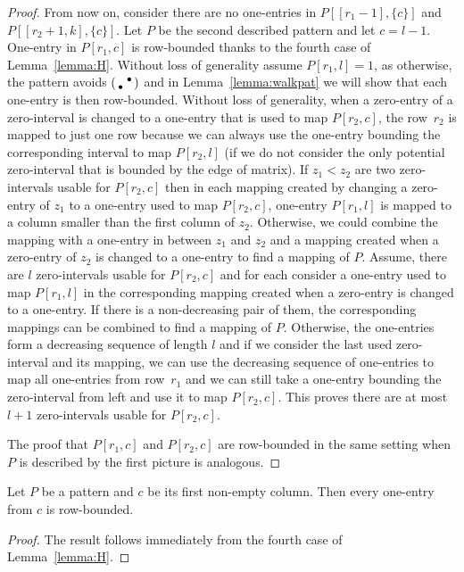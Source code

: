 \begin{proof}
From now on, consider there are no one-entries in $P[[r_1-1],\{c\}]$ and $P[[r_2+1,k],\{c\}]$. Let $P$ be the second described pattern and let $c=l-1$. One-entry in $P[r_1,c]$ is row-bounded thanks to the fourth case of Lemma~\ref{lemma:H}. Without loss of generality assume $P[r_1,l]=1$, as otherwise, the pattern avoids $\left(\begin{smallmatrix} &\bullet\\\bullet& \end{smallmatrix}\right)$ and in Lemma~\ref{lemma:walkpat} we will show that each one-entry is then row-bounded. Without loss of generality, when a zero-entry of a zero-interval is changed to a one-entry that is used to map $P[r_2,c]$, the row~$r_2$ is mapped to just one row because we can always use the one-entry bounding the corresponding interval to map $P[r_2,l]$ (if we do not consider the only potential zero-interval that is bounded by the edge of matrix). If $z_1<z_2$ are two zero-intervals usable for $P[r_2,c]$ then in each mapping created by changing a zero-entry of $z_1$ to a one-entry used to map $P[r_2,c]$, one-entry $P[r_1,l]$ is mapped to a column smaller than the first column of $z_2$. Otherwise, we could combine the mapping with a one-entry in between $z_1$ and $z_2$ and a mapping created when a zero-entry of $z_2$ is changed to a one-entry to find a mapping of $P$. Assume, there are $l$ zero-intervals usable for $P[r_2,c]$ and for each consider a one-entry used to map $P[r_1,l]$ in the corresponding mapping created when a zero-entry is changed to a one-entry. If there is a non-decreasing pair of them, the corresponding mappings can be combined to find a mapping of $P$. Otherwise, the one-entries form a decreasing sequence of length $l$ and if we consider the last used zero-interval and its mapping, we can use the decreasing sequence of one-entries to map all one-entries from row~$r_1$ and we can still take a one-entry bounding the zero-interval from left and use it to map $P[r_2,c]$. This proves there are at most $l+1$ zero-intervals usable for $P[r_2,c]$.

The proof that $P[r_1,c]$ and $P[r_2,c]$ are row-bounded in the same setting when $P$ is described by the first picture is analogous.
\end{proof}

\begin{lemma}
\label{lemma:First}
Let $P$ be a pattern and $c$ be its first non-empty column. Then every one-entry from $c$ is row-bounded.
\end{lemma}
\begin{proof}
The result follows immediately from the fourth case of Lemma~\ref{lemma:H}.
\end{proof}

